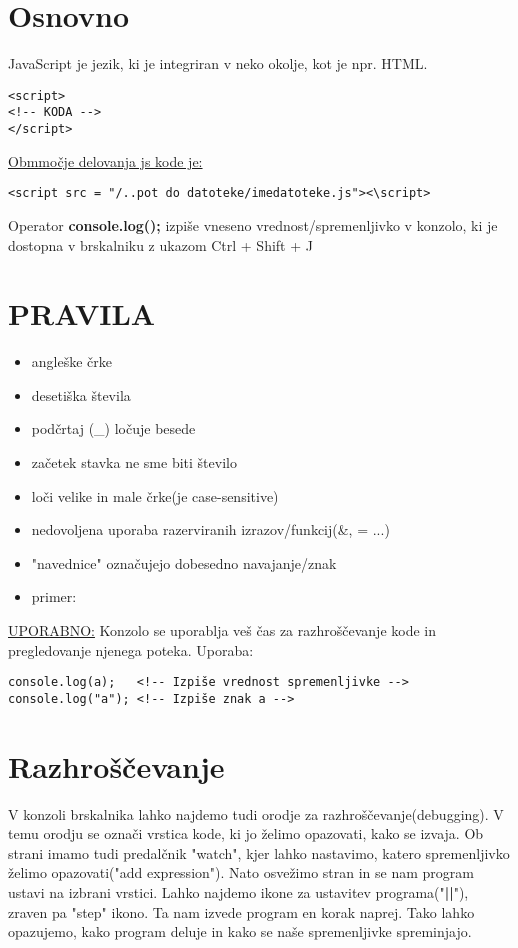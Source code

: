 \section{Osnovno}

JavaScript je jezik, ki je integriran v neko okolje, kot je npr. HTML.
\begin{verbatim}
<script>
<!-- KODA -->
</script>
\end{verbatim}

\underline{Obmmočje delovanja js kode je:} 
\begin{verbatim}
<script src = "/..pot do datoteke/imedatoteke.js"><\script>
\end{verbatim}

Operator \textbf{console.log();} izpiše vneseno vrednost/spremenljivko v konzolo, ki je dostopna v brskalniku z ukazom Ctrl + Shift + J

\section{PRAVILA}
\begin{itemize}
	\item angleške črke
	\item desetiška števila
	\item podčrtaj (\_) ločuje besede
	\item začetek stavka ne sme biti število
	\item loči velike in male črke(je case-sensitive) 
	\item nedovoljena uporaba razerviranih izrazov/funkcij(\&, = ...)
	\item "navednice" označujejo dobesedno navajanje/znak
	\item primer:
\end{itemize}
\underline{UPORABNO:} Konzolo se uporablja veš čas za razhroščevanje kode in pregledovanje njenega poteka. Uporaba:
\begin{verbatim}
console.log(a);   <!-- Izpiše vrednost spremenljivke -->
console.log("a"); <!-- Izpiše znak a -->
\end{verbatim}

\pagebreak

\section{Razhroščevanje}

V konzoli brskalnika lahko najdemo tudi orodje za razhroščevanje(debugging). V temu orodju se označi vrstica kode, ki jo želimo opazovati, kako se izvaja. Ob strani imamo tudi predalčnik "watch", kjer lahko nastavimo, katero spremenljivko želimo opazovati("add expression"). Nato osvežimo stran in se nam program ustavi na izbrani vrstici. Lahko najdemo ikone za ustavitev programa("\textbf{||}"), zraven pa "step" ikono. Ta nam izvede program en korak naprej. Tako lahko opazujemo, kako program deluje in kako se naše spremenljivke spreminjajo.


